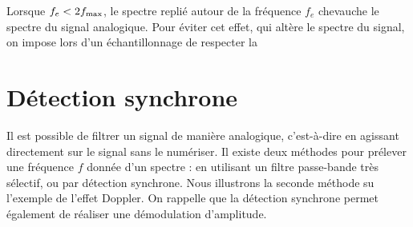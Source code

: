 Lorsque $f_e < 2f_{\rm max}$, le spectre replié autour de la fréquence $f_e$ chevauche le spectre du signal analogique. Pour éviter cet effet, qui altère le spectre du signal, on impose lors d'un échantillonnage de respecter la

%
%



\section{Détection synchrone}
\label{sec:mod_amp}

Il est possible de filtrer un signal de manière analogique, c'est-à-dire en agissant directement sur le signal sans le numériser. Il existe deux méthodes pour prélever une fréquence $f$ donnée d'un spectre : en utilisant un filtre passe-bande très sélectif, ou par détection synchrone. Nous illustrons la seconde méthode su l'exemple de l'effet Doppler. On rappelle que la détection synchrone permet également de réaliser une démodulation d'amplitude.

